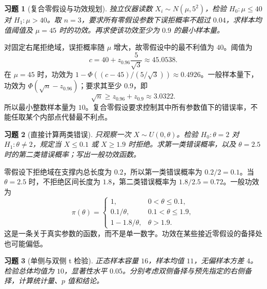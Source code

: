 \documentclass[UTF8,12pt,a4paper,fontset=fandol]{ctexart}
\newtheorem{exercise}{习题}[section]
\begin{document}
\begin{exercise}[复合零假设与功效规划]\label{q:M-P8-3}
独立仪器读数 $X_i\sim N(\mu,5^2)$，检验 $H_0:\mu\le40$ 对 $H_1:\mu>40$。取 $n=3$，要求所有零假设参数下误拒概率不超过 $0.04$，求样本均值阈值及 $\mu=45$ 时的功效。再求使该功效至少为 $0.9$ 的最小样本量。\par{}
\end{exercise}

\begin{solve}\label{a:M-P8-3}对固定右尾拒绝域，误拒概率随 $\mu$ 增大，故零假设中的最不利值为 $40$。阈值为\[c=40+z_{0.96}\frac5{\sqrt3}\approx45.0538.\]在 $\mu=45$ 时，功效为 $1-\Phi((c-45)/(5/\sqrt3))\approx0.4926$。一般样本量下，功效为 $\Phi(\sqrt n-z_{0.96})$；要求其至少 $0.9$，即\[\sqrt n\ge z_{0.96}+z_{0.9}\approx3.0322.\]所以最小整数样本量为 $10$。复合零假设要求控制其中所有参数值下的错误率，不能任取某个内部点代替最不利点。\end{solve}

\begin{exercise}[直接计算两类错误]\label{q:M-P8-4}
只观察一次 $X\sim U(0,\theta)$。检验 $H_0:\theta=2$ 对 $H_1:\theta\ne2$，规定当 $X\le0.1$ 或 $X\ge1.9$ 时拒绝。求第一类错误概率，以及 $\theta=2.5$ 时的第二类错误概率；写出一般功效函数。\par{}
\end{exercise}

\begin{solve}\label{a:M-P8-4}零假设下拒绝域在支撑内总长度为 $0.2$，所以第一类错误概率为 $0.2/2=0.1$。当 $\theta=2.5$ 时，不拒绝区间长度为 $1.8$，第二类错误概率为 $1.8/2.5=0.72$。一般功效为\[\pi(\theta)=\begin{cases}1,&0<\theta\le0.1,\\0.1/\theta,&0.1<\theta\le1.9,\\1-1.8/\theta,&\theta>1.9.\end{cases}\]这是一条关于真实参数的函数，而不是单一数字。功效在某些接近零假设的备择处也可能偏低。\end{solve}

\begin{exercise}[单侧与双侧 t 检验]\label{q:M-P9-1}
正态样本容量 $16$，样本均值 $11$，无偏样本方差 $4$。检验总体均值为 $10$，显著性水平 $0.05$。分别考虑双侧备择与预先指定的右侧备择，计算统计量、$p$ 值和结论。\par{}
\end{exercise}
\end{document}
